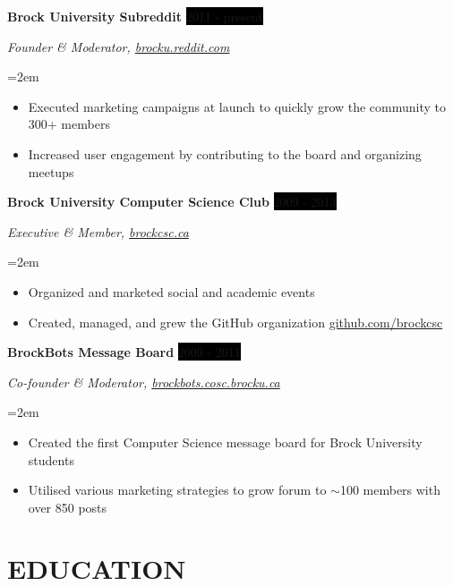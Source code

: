 \documentclass[paper=a4,fontsize=11pt]{scrartcl} %
\newcommand{\getenv}[2][]{%
  \CatchFileEdef{\temp}{"|kpsewhich --var-value #2"}{\endlinechar=-1}%
  \if\relax\detokenize{#1}\relax\temp\else\let#1\temp\fi}
\newcommand{\ifCV}[1]{
  \getenv[\CV]{CV}
  \ifdefstring{\CV}{true}{#1}{}
}
\newcommand{\sepspace}{\vspace*{1em}}     %
\newcommand{\NewPart}[1]{\section*{\uppercase{#1}}}
\newcommand{\EducationEntry}[4]{
    \noindent \textbf{#1} \hfill        %
    \colorbox{Black}{
      \parbox{8.5em}{
      \hfill\color{White}#2}} \par      %
    \noindent \textit{#3} \par          %
    \noindent\hangindent=2em\hangafter=0 \small #4 %
    \normalsize \par}
\newcommand{\OrganizationEntry}[4]{         %
    \noindent \textbf{#1} \hfill            %
    \colorbox{Black}{\color{White}#2} \par  %
    \noindent \textit{#3} \par              %
    \noindent\hangindent=2em\hangafter=0 \small #4 %
    \normalsize \par}
\begin{document}
{\OrganizationEntry{Brock University Subreddit}{2011 - present}
{Founder \& Moderator, \href{https://brocku.reddit.com/}{brocku.reddit.com}}
{
  \begin{itemize} \itemsep -1pt
    \item Executed marketing campaigns at launch to quickly grow the community to 300+ members
    \item Increased user engagement by contributing to the board and organizing meetups
  \end{itemize}
}
\sepspace

\OrganizationEntry{Brock University Computer Science Club}{2009 - 2013}
{Executive \& Member, \href{https://brockcsc.ca/}{brockcsc.ca}}
{
  \begin{itemize} \itemsep -1pt
    \item Organized and marketed social and academic events
    \item Created, managed, and grew the GitHub organization \href{https://github.com/brockcsc}{github.com/brockcsc} %
  \end{itemize}
}
\sepspace

\OrganizationEntry{BrockBots Message Board}{2009 - 2011}
{Co-founder \& Moderator, \href{https://web.archive.org/web/20110208180409/http://brockbots.cosc.brocku.ca/}{brockbots.cosc.brocku.ca}}
{
  \begin{itemize} \itemsep -1pt
    \item Created the first Computer Science message board for Brock University students
    \item Utilised various marketing strategies to grow forum to $\sim$100 members with over 850 posts %
  \end{itemize}
}
} %

\NewPart{Education}{}
\end{document}
